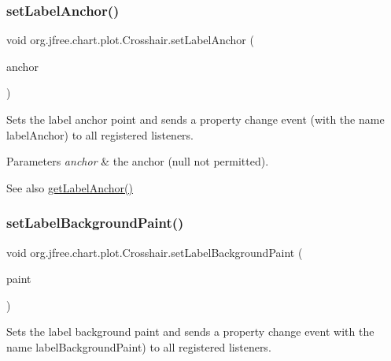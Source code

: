 \subsubsection{\texorpdfstring{set\+Label\+Anchor()}{setLabelAnchor()}}
{\footnotesize\ttfamily void org.\+jfree.\+chart.\+plot.\+Crosshair.\+set\+Label\+Anchor (\begin{DoxyParamCaption}\item[{Rectangle\+Anchor}]{anchor }\end{DoxyParamCaption})}

Sets the label anchor point and sends a property change event (with the name \textquotesingle{}label\+Anchor\textquotesingle{}) to all registered listeners.


\begin{DoxyParams}{Parameters}
{\em anchor} & the anchor ({\ttfamily null} not permitted).\\
\hline
\end{DoxyParams}
\begin{DoxySeeAlso}{See also}
\mbox{\hyperlink{classorg_1_1jfree_1_1chart_1_1plot_1_1_crosshair_a4615a9fac60f3e5cf4b3de47e0cff882}{get\+Label\+Anchor()}} 
\end{DoxySeeAlso}
\mbox{\label{classorg_1_1jfree_1_1chart_1_1plot_1_1_crosshair_ac9af1982e63da81f4b921beb1dd4fbc0}} 
\subsubsection{\texorpdfstring{set\+Label\+Background\+Paint()}{setLabelBackgroundPaint()}}
{\footnotesize\ttfamily void org.\+jfree.\+chart.\+plot.\+Crosshair.\+set\+Label\+Background\+Paint (\begin{DoxyParamCaption}\item[{Paint}]{paint }\end{DoxyParamCaption})}

Sets the label background paint and sends a property change event with the name \textquotesingle{}label\+Background\+Paint\textquotesingle{}) to all registered listeners.



